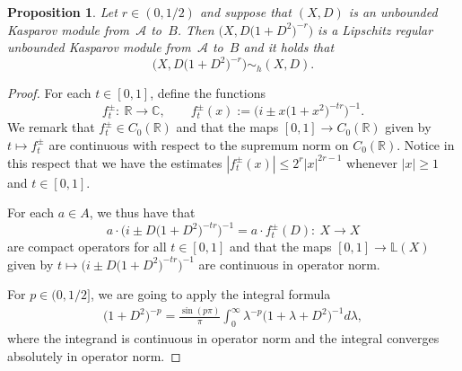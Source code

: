 \documentclass[11pt]{article}
\numberwithin{equation}{section}
\newtheorem{prop}[Theorem]{Proposition}
 { \theoremstyle{definition}
\newtheorem{dfn}[Theorem]{Definition}
\newtheorem{exa}[Theorem]{Example}
\newtheorem{rem}[Theorem]{Remark} }
\newcommand{\cd}{\cdot}
\newcommand{\la}{\lambda}
\newcommand{\s}[1]{\mathscr{#1}}
\newcommand{\B}[1]{\mathbb{#1}}
\begin{document}
\begin{prop}\label{p:liphom}Let $r \in (0,1/2)$ and suppose that $(X,D)$ is an unbounded Kasparov module from~$\s A$ to~$B$. Then $\big(X,D\big(1 + D^2\big)^{-r}\big)$ is a Lipschitz regular unbounded Kasparov module from~$\s A$ to~$B$ and it holds that
\[
\big(X, D\big(1 + D^2\big)^{-r}\big) \sim_h (X,D) .
\]
\end{prop}
\begin{proof}For each $t \in [0,1]$, define the functions
\[
f_t^{\pm}\colon \ \B R \to \B C, \qquad f_t^{\pm}(x) := \big( i \pm x \big(1 + x^2\big)^{-tr} \big)^{-1} .
\]
We remark that $f_t^{\pm} \in C_0( \B R )$ and that the maps $[0,1] \to C_0(\B R)$ given by $t \mapsto f_t^{\pm}$ are continuous with respect to the supremum norm on $C_0( \B R)$. Notice in this respect that we have the estimates $| f_t^{\pm}(x) | \leq 2^r |x|^{2r - 1}$ whenever $|x| \geq 1$ and $t \in [0,1]$.

For each $a \in A$, we thus have that
\[
a \cd \big(i \pm D\big(1 + D^2\big)^{-tr}\big)^{-1} = a \cd f_t^{\pm}(D)\colon \ X \to X
\]
are compact operators for all $t \in [0,1]$ and that the maps $[0,1] \to \B L(X)$ given by $t \mapsto \big(i \pm D\big(1 + D^2\big)^{-tr}\big)^{-1}$ are continuous in operator norm.

For $p \in (0,1/2]$, we are going to apply the integral formula
\begin{gather}\label{eq:intpow}
\big(1 + D^2\big)^{-p} = \frac{\sin(p \pi)}{\pi} \int_0^\infty \la^{-p} \big(1 + \la + D^2\big)^{-1} d\la ,
\end{gather}
where the integrand is continuous in operator norm and the integral converges absolutely in operator norm.


\end{proof}
\end{document}
